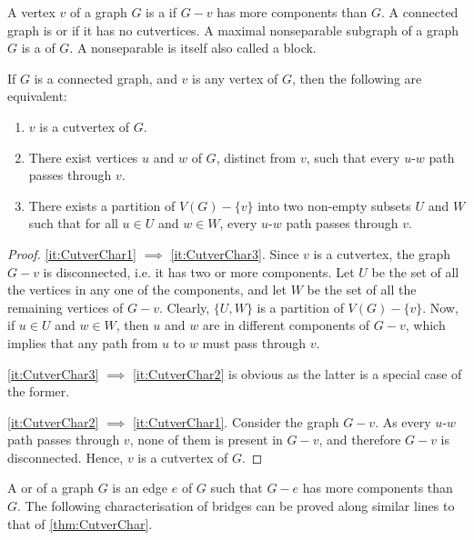 A vertex $v$ of a graph $G$ is a  if $G - v$ has more components than $G$. A connected graph is  or  if it has no cutvertices. A maximal nonseparable subgraph of a graph $G$ is a  of $G$. A nonseparable is itself also called a block.

\begin{Theorem}\label{thm:CutverChar}
If $G$ is a connected graph, and $v$ is any vertex of $G$, then the following are equivalent:
\begin{enumerate}[label=(\roman*)]
\item\label{it:CutverChar1} $v$ is a cutvertex of $G$.
\item\label{it:CutverChar2} There exist vertices $u$ and $w$ of $G$, distinct from $v$, such that every $u$-$w$ path passes through $v$.
\item\label{it:CutverChar3} There exists a partition of $V(G) - \{v\}$ into two non-empty subsets $U$ and $W$ such that for all $u \in U$ and $w \in W$, every $u$-$w$ path passes through $v$.
\end{enumerate}
\end{Theorem}

\begin{proof}
\cref{it:CutverChar1} $\implies $ \cref{it:CutverChar3}. Since $v$ is a cutvertex, the graph $G - v$ is disconnected, i.e. it has two or more components. Let $U$ be the set of all the vertices in any one of the components, and let $W$ be the set of all the remaining vertices of $G - v$. Clearly, $\{U, W\}$ is a partition of $V(G) - \{v\}$. Now, if $u \in U$ and $w \in W$, then $u$ and $w$ are in different components of $G - v$, which implies that any path from $u$ to $w$ must pass through $v$.

\noindent \cref{it:CutverChar3} $\implies$ \cref{it:CutverChar2} is obvious as the latter is a special case of the former.

\noindent \cref{it:CutverChar2} $\implies$ \cref{it:CutverChar1}. Consider the graph $G - v$. As every $u$-$w$ path passes through $v$, none of them is present in $G - v$, and therefore $G - v$ is disconnected. Hence, $v$ is a cutvertex of $G$.
\end{proof}

A  or  of a graph $G$ is an edge $e$ of $G$ such that $G - e$ has more components than $G$. The following characterisation of bridges can be proved along similar lines to that of \cref{thm:CutverChar}.

